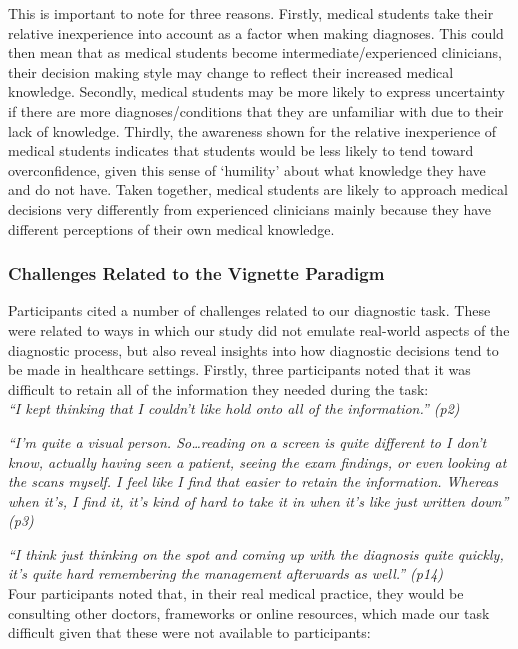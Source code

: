 \documentclass[a4paper, nobind]{templates/ociamthesis}
\begin{document}
\hfill\break
This is important to note for three reasons. Firstly, medical students take their relative inexperience into account as a factor when making diagnoses. This could then mean that as medical students become intermediate/experienced clinicians, their decision making style may change to reflect their increased medical knowledge. Secondly, medical students may be more likely to express uncertainty if there are more diagnoses/conditions that they are unfamiliar with due to their lack of knowledge. Thirdly, the awareness shown for the relative inexperience of medical students indicates that students would be less likely to tend toward overconfidence, given this sense of `humility' about what knowledge they have and do not have. Taken together, medical students are likely to approach medical decisions very differently from experienced clinicians mainly because they have different perceptions of their own medical knowledge.

\subsubsection{Challenges Related to the Vignette Paradigm}\label{challenges-related-to-the-vignette-paradigm}

Participants cited a number of challenges related to our diagnostic task. These were related to ways in which our study did not emulate real-world aspects of the diagnostic process, but also reveal insights into how diagnostic decisions tend to be made in healthcare settings. Firstly, three participants noted that it was difficult to retain all of the information they needed during the task:\\

\emph{``I kept thinking that I couldn't like hold onto all of the information.'' (p2)}

\emph{``I'm quite a visual person. So\ldots reading on a screen is quite different to I don't know, actually having seen a patient, seeing the exam findings, or even looking at the scans myself. I feel like I find that easier to retain the information. Whereas when it's, I find it, it's kind of hard to take it in when it's like just written down'' (p3)}

\emph{``I think just thinking on the spot and coming up with the diagnosis quite quickly, it's quite hard remembering the management afterwards as well.'' (p14)}\\

Four participants noted that, in their real medical practice, they would be consulting other doctors, frameworks or online resources, which made our task difficult given that these were not available to participants:\\
\end{document}
